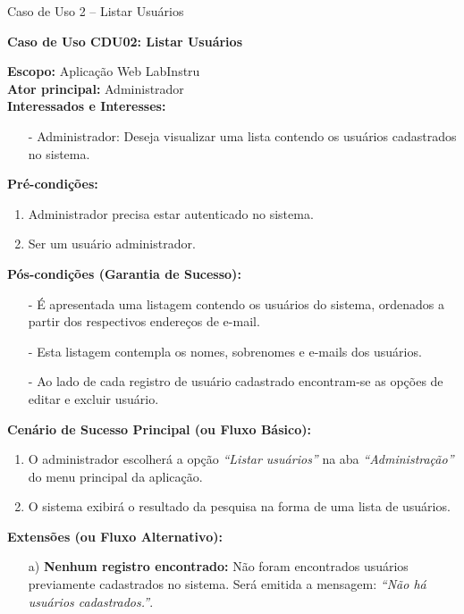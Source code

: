 \newpage
\begin{quadro}[h!]\caption{Caso de Uso 2 -- Listar Usuários}
\hfill
\end{quadro}
	\begin{mdframed}

		\textbf{Caso de Uso CDU02: Listar Usuários}\\
		\begin{flushleft}
		\textbf{Escopo:} Aplicação Web LabInstru\\
		\textbf{Ator principal:} Administrador\\
		\textbf{Interessados e Interesses:}
		\begin{itemize}
			\item[-] Administrador: Deseja visualizar uma lista contendo os usuários cadastrados no sistema.
		\end{itemize}
		\textbf{Pré-condições:}\\
			 \begin{enumerate}
			 	\item{Administrador precisa estar autenticado no sistema.}
			 	\item{Ser um usuário administrador.}
			 \end{enumerate}
		\textbf{Pós-condições (Garantia de Sucesso):}
		\begin{itemize}
			\item[-] É apresentada uma listagem contendo os usuários do sistema, ordenados a partir dos respectivos endereços de e-mail.
			\item[-] Esta listagem contempla os nomes, sobrenomes e e-mails dos usuários.
			\item[-] Ao lado de cada registro de usuário cadastrado encontram-se as opções de editar e excluir usuário.
		\end{itemize}
		\textbf{Cenário de Sucesso Principal (ou Fluxo Básico):}\\
			\begin{enumerate}
			 	\item{O administrador escolherá a opção \textit{``Listar usuários''} na aba \textit{``Administração''} do menu principal da aplicação.}
			 	\item{O sistema exibirá o resultado da pesquisa na forma de uma lista de usuários.}
			 \end{enumerate}

		\textbf{Extensões (ou Fluxo Alternativo):}
		\begin{itemize}
			\item[a)] \textbf{Nenhum registro encontrado:} Não foram encontrados  usuários previamente cadastrados no sistema. Será emitida a mensagem: \textit{``Não há usuários cadastrados.''}.
		\end{itemize}

		\end{flushleft}

	\end{mdframed}

